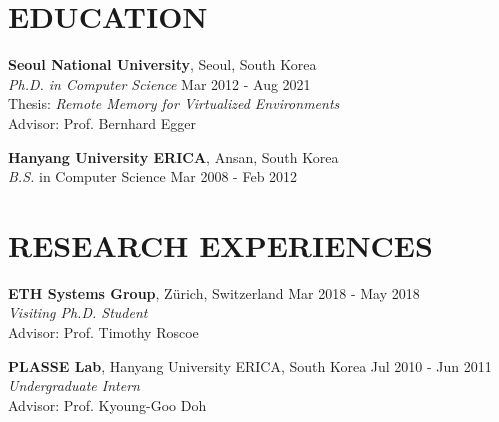 \documentclass[margin]{res}
\begin{document}
\begin{resume}
\vspace{-0.3em}
\section{EDUCATION}
\textbf{Seoul National University}, Seoul, South Korea \\
{\sl Ph.D. in Computer Science} \hfill Mar 2012 - Aug 2021 \\
Thesis: \textit{Remote Memory for Virtualized Environments} \\
Advisor: Prof. Bernhard Egger

\vspace{-0.5em}
\textbf{Hanyang University ERICA}, Ansan, South Korea \\
{\sl B.S.} in Computer Science \hfill Mar 2008 - Feb 2012 \\


\vspace{-1.5em}
\section{RESEARCH EXPERIENCES}
\par
\textbf{ETH Systems Group}, Z{\"u}rich, Switzerland \hfill Mar 2018 - May 2018 \\
\textit{Visiting Ph.D. Student} \\
Advisor: Prof. Timothy Roscoe \\

\vspace{-1.5em}
\par
\textbf{PLASSE Lab}, Hanyang University ERICA, South Korea \hfill Jul 2010 - Jun 2011 \\
\textit{Undergraduate Intern} \\
Advisor: Prof. Kyoung-Goo Doh \\


\vspace{-1.5em}

\end{resume}
\end{document}
